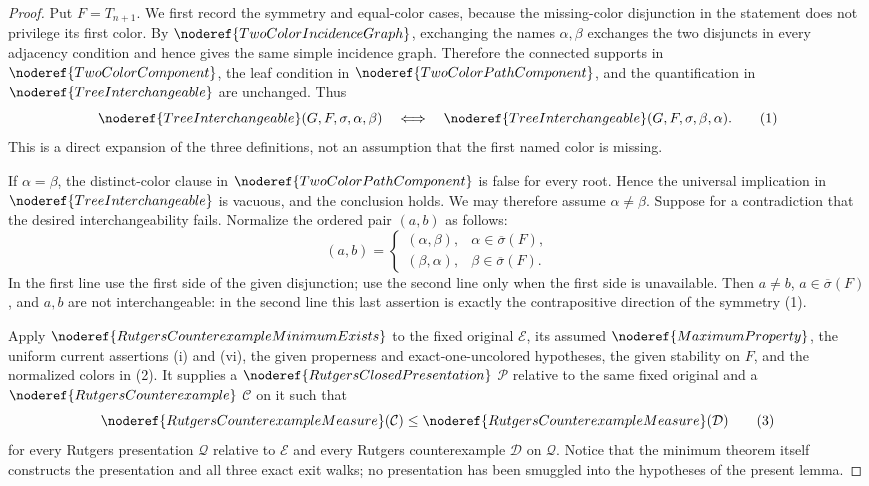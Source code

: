 \begin{proof}
Put \(F=T_{n+1}\).  We first record the symmetry and equal-color cases,
because the missing-color disjunction in the statement does not privilege
its first color.  By \(\noderef{TwoColorIncidenceGraph}\), exchanging
the names \(\alpha,\beta\) exchanges the two disjuncts in every adjacency
condition and hence gives the same simple incidence graph.  Therefore the
connected supports in \(\noderef{TwoColorComponent}\), the leaf
condition in \(\noderef{TwoColorPathComponent}\), and the quantification
in \(\noderef{TreeInterchangeable}\) are unchanged.  Thus
\[
 \noderef{TreeInterchangeable}(G,F,\sigma,\alpha,\beta)
 \quad\Longleftrightarrow\quad
 \noderef{TreeInterchangeable}(G,F,\sigma,\beta,\alpha).      \tag{1}
\]
This is a direct expansion of the three definitions, not an assumption
that the first named color is missing.

If \(\alpha=\beta\), the distinct-color clause in
\(\noderef{TwoColorPathComponent}\) is false for every root.  Hence the
universal implication in \(\noderef{TreeInterchangeable}\) is vacuous,
and the conclusion holds.  We may therefore assume
\(\alpha\ne\beta\).  Suppose for a contradiction that the desired
interchangeability fails.  Normalize the ordered pair \((a,b)\) as
follows:
\[
 (a,b)=
 \begin{cases}
  (\alpha,\beta),&
    \alpha\in\overline\sigma(F),\\
  (\beta,\alpha),&
    \beta\in\overline\sigma(F).
 \end{cases}                                                   \tag{2}
\]
In the first line use the first side of the given disjunction; use the
second line only when the first side is unavailable.  Then
\(a\ne b\), \(a\in\overline\sigma(F)\), and \(a,b\) are not
interchangeable: in the second line this last assertion is exactly the
contrapositive direction of the symmetry (1).

Apply \(\noderef{RutgersCounterexampleMinimumExists}\) to the fixed
original \(\mathcal E\), its assumed
\(\noderef{MaximumProperty}\), the uniform current assertions (i) and
(vi), the given properness and exact-one-uncolored hypotheses, the given
stability on \(F\), and the normalized colors in (2).  It supplies a
\(\noderef{RutgersClosedPresentation}\) \(\mathcal P\) relative to
the same fixed original and a \(\noderef{RutgersCounterexample}\)
\(\mathcal C\) on it such that
\[
 \noderef{RutgersCounterexampleMeasure}(\mathcal C)
 \leq
 \noderef{RutgersCounterexampleMeasure}(\mathcal D)           \tag{3}
\]
for every Rutgers presentation \(\mathcal Q\) relative to
\(\mathcal E\) and every Rutgers counterexample \(\mathcal D\) on
\(\mathcal Q\).  Notice that the minimum theorem itself constructs the
presentation and all three exact exit walks; no presentation has been
smuggled into the hypotheses of the present lemma.


\end{proof}
